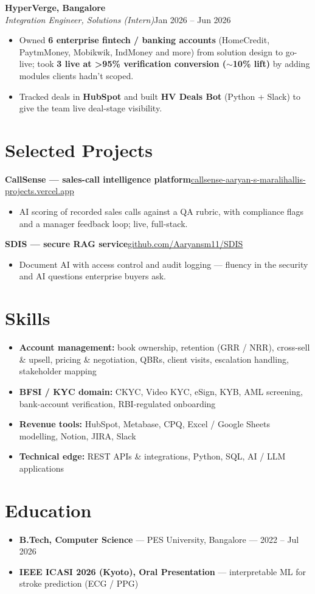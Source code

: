 \documentclass[10pt,a4paper]{article}
\begin{document}
\vspace{1pt}\textbf{HyperVerge, Bangalore}\\
\textit{Integration Engineer, Solutions (Intern)}\hfill Jan 2026 -- Jun 2026\par\vspace{1pt}
\begin{itemize}
\item Owned \textbf{6 enterprise fintech / banking accounts} (HomeCredit, PaytmMoney, Mobikwik, IndMoney and more) from solution design to go-live; took \textbf{3 live at \textgreater{}95\% verification conversion ($\sim$10\% lift)} by adding modules clients hadn't scoped.
\item Tracked deals in \textbf{HubSpot} and built \textbf{HV Deals Bot} (Python + Slack) to give the team live deal-stage visibility.
\end{itemize}
\section*{Selected Projects}
\vspace{1pt}\textbf{CallSense --- sales-call intelligence platform}\hfill {\small\href{https://callsense-aaryan-s-maralihallis-projects.vercel.app}{callsense-aaryan-s-maralihallis-projects.vercel.app}}
\begin{itemize}
\item AI scoring of recorded sales calls against a QA rubric, with compliance flags and a manager feedback loop; live, full-stack.
\end{itemize}
\vspace{1pt}\textbf{SDIS --- secure RAG service}\hfill {\small\href{https://github.com/Aaryansm11/SDIS}{github.com/Aaryansm11/SDIS}}
\begin{itemize}
\item Document AI with access control and audit logging --- fluency in the security and AI questions enterprise buyers ask.
\end{itemize}
\section*{Skills}
\begin{itemize}
\item \textbf{Account management:} book ownership, retention (GRR / NRR), cross-sell \& upsell, pricing \& negotiation, QBRs, client visits, escalation handling, stakeholder mapping
\item \textbf{BFSI / KYC domain:} CKYC, Video KYC, eSign, KYB, AML screening, bank-account verification, RBI-regulated onboarding
\item \textbf{Revenue tools:} HubSpot, Metabase, CPQ, Excel / Google Sheets modelling, Notion, JIRA, Slack
\item \textbf{Technical edge:} REST APIs \& integrations, Python, SQL, AI / LLM applications
\end{itemize}
\section*{Education}
\begin{itemize}
\item \textbf{B.Tech, Computer Science} --- PES University, Bangalore --- 2022 -- Jul 2026
\item \textbf{IEEE ICASI 2026 (Kyoto), Oral Presentation} --- interpretable ML for stroke prediction (ECG / PPG)
\end{itemize}
\end{document}
